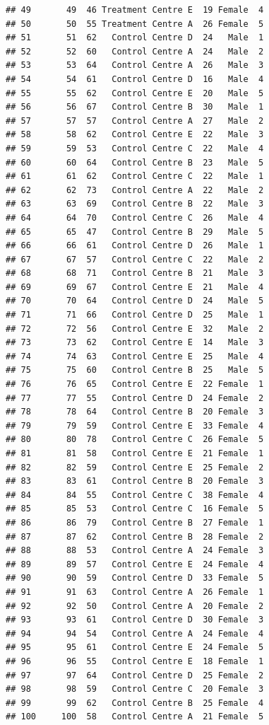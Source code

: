 \documentclass[]{article}
\begin{document}
\begin{verbatim}
## 49       49  46 Treatment Centre E  19 Female  4
## 50       50  55 Treatment Centre A  26 Female  5
## 51       51  62   Control Centre D  24   Male  1
## 52       52  60   Control Centre A  24   Male  2
## 53       53  64   Control Centre A  26   Male  3
## 54       54  61   Control Centre D  16   Male  4
## 55       55  62   Control Centre E  20   Male  5
## 56       56  67   Control Centre B  30   Male  1
## 57       57  57   Control Centre A  27   Male  2
## 58       58  62   Control Centre E  22   Male  3
## 59       59  53   Control Centre C  22   Male  4
## 60       60  64   Control Centre B  23   Male  5
## 61       61  62   Control Centre C  22   Male  1
## 62       62  73   Control Centre A  22   Male  2
## 63       63  69   Control Centre B  22   Male  3
## 64       64  70   Control Centre C  26   Male  4
## 65       65  47   Control Centre B  29   Male  5
## 66       66  61   Control Centre D  26   Male  1
## 67       67  57   Control Centre C  22   Male  2
## 68       68  71   Control Centre B  21   Male  3
## 69       69  67   Control Centre E  21   Male  4
## 70       70  64   Control Centre D  24   Male  5
## 71       71  66   Control Centre D  25   Male  1
## 72       72  56   Control Centre E  32   Male  2
## 73       73  62   Control Centre E  14   Male  3
## 74       74  63   Control Centre E  25   Male  4
## 75       75  60   Control Centre B  25   Male  5
## 76       76  65   Control Centre E  22 Female  1
## 77       77  55   Control Centre D  24 Female  2
## 78       78  64   Control Centre B  20 Female  3
## 79       79  59   Control Centre E  33 Female  4
## 80       80  78   Control Centre C  26 Female  5
## 81       81  58   Control Centre E  21 Female  1
## 82       82  59   Control Centre E  25 Female  2
## 83       83  61   Control Centre B  20 Female  3
## 84       84  55   Control Centre C  38 Female  4
## 85       85  53   Control Centre C  16 Female  5
## 86       86  79   Control Centre B  27 Female  1
## 87       87  62   Control Centre B  28 Female  2
## 88       88  53   Control Centre A  24 Female  3
## 89       89  57   Control Centre E  24 Female  4
## 90       90  59   Control Centre D  33 Female  5
## 91       91  63   Control Centre A  26 Female  1
## 92       92  50   Control Centre A  20 Female  2
## 93       93  61   Control Centre D  30 Female  3
## 94       94  54   Control Centre A  24 Female  4
## 95       95  61   Control Centre E  24 Female  5
## 96       96  55   Control Centre E  18 Female  1
## 97       97  64   Control Centre D  25 Female  2
## 98       98  59   Control Centre C  20 Female  3
## 99       99  62   Control Centre B  25 Female  4
## 100     100  58   Control Centre A  21 Female  5
\end{verbatim}
\end{document}
